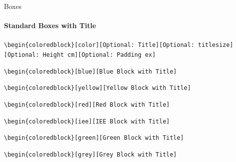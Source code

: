 \documentclass[aspectratio=169]{beamer}
\begin{document}
\begin{frame}{Boxes}
    \framesubtitle{Standard Boxes with Title}

    \footnotesize\centering\texttt{\textbackslash begin\{coloredblock\}[color][Optional:~Title][Optional:~titlesize][Optional:~Height cm][Optional:~Padding ex]}
    
    \begin{minipage}[t]{0.49\textwidth}
    
        \begin{coloredblock}
            \texttt{\textbackslash begin\{coloredblock\}[blue][Blue Block with Title]}\strut
        \end{coloredblock}

        \begin{coloredblock}
            \texttt{\textbackslash begin\{coloredblock\}[yellow][Yellow Block with Title]}\strut
        \end{coloredblock}

        \begin{coloredblock}
            \texttt{\textbackslash begin\{coloredblock\}[red][Red Block with Title]}\strut
        \end{coloredblock}
        
    \end{minipage}
    \hfill
    \begin{minipage}[t]{0.49\textwidth}
    
        \begin{coloredblock}
            \texttt{\textbackslash begin\{coloredblock\}[iee][IEE Block with Title]}\strut
        \end{coloredblock}

        \begin{coloredblock}
            \texttt{\textbackslash begin\{coloredblock\}[green][Green Block with Title]}\strut
        \end{coloredblock}

        \begin{coloredblock}
            \texttt{\textbackslash begin\{coloredblock\}[grey][Grey Block with Title]}\strut
        \end{coloredblock}
        
    \end{minipage}
\end{frame}
\end{document}
